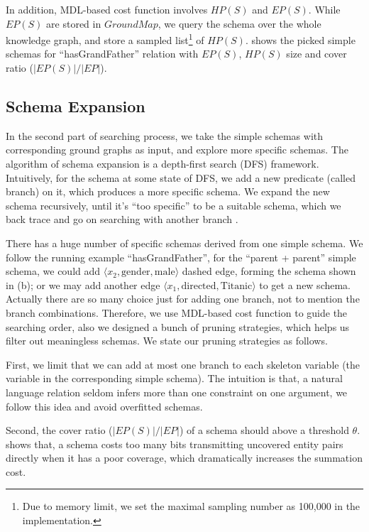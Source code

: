 In addition, MDL-based cost function involves $HP(S)$ and $EP(S)$. While $EP(S)$ are
stored in $GroundMap$, we query the schema over the whole knowledge graph, and store
a sampled list\footnote{Due to memory limit, we set the maximal sampling number
as 100,000 in the implementation.} of $HP(S)$.
 shows the picked simple schemas for ``hasGrandFather''
relation with $EP(S)$, $HP(S)$ size and cover ratio ($|EP(S)| / |EP|$).

\subsection{Schema Expansion}
In the second part of searching process, we take the simple schemas with
corresponding ground graphs as input, and explore more specific schemas.
The algorithm of schema expansion is a depth-first search (DFS) framework.
Intuitively, for the schema at some state of DFS, we add a new predicate (called branch)
on it, which produces a more specific schema.
We expand the new schema recursively, until it's ``too specific''
to be a suitable schema, which we back trace and go on searching with another branch .

There has a huge number of specific schemas derived from one simple schema.
We follow the running example ``hasGrandFather'', for the ``parent + parent'' simple
schema, we could add $\langle x_2, \text{gender}, \text{male} \rangle$ dashed edge,
forming the schema shown in (b);
or we may add another edge
$\langle x_1, \text{directed}, \text{Titanic} \rangle$ to get a new schema.
Actually there are so many choice just for adding one branch, not to mention the
branch combinations.
Therefore, we use MDL-based cost function to guide the searching order,
also we designed a bunch of pruning strategies, which helps us filter out
meaningless schemas. We state our pruning strategies as follows.

First, we limit that we can add at most one
branch to each skeleton variable (the variable in the corresponding simple schema).
The intuition is that, a natural language relation seldom infers more than one
constraint on one argument, we follow this idea and avoid overfitted schemas.

Second, the cover ratio ($|EP(S)| / |EP|$) of a schema should above a threshold $\theta$.
 shows that, a schema costs too many bits transmitting
uncovered entity pairs directly when it has a poor coverage,
which dramatically increases the summation cost.

